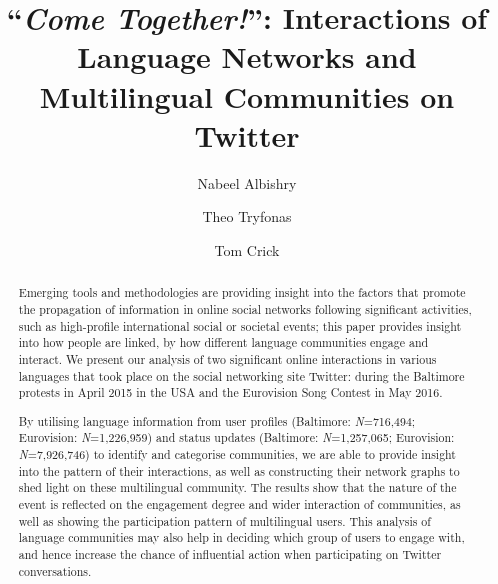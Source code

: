 \documentclass[sigconf]{acmart}
\begin{document}
\title[Interactions of Language Networks and Multilingual Communities on Twitter]{``{\emph{Come Together!}}'': Interactions of Language Networks and Multilingual Communities on Twitter}

\author{Nabeel Albishry}

\author{Theo Tryfonas}

\author{Tom Crick}

\renewcommand{\shortauthors}{N. Albishry et al.}


\begin{abstract}
Emerging tools and methodologies are providing insight into the
factors that promote the propagation of information in online social
networks following significant activities, such as high-profile
international social or societal events; this paper provides insight
into how people are linked, by how different language communities
engage and interact. We present our analysis of two significant online
interactions in various languages that took place on the social
networking site Twitter: during the Baltimore protests in April 2015
in the USA and the Eurovision Song Contest in May 2016.

By utilising language information from user profiles (Baltimore:
{\emph{N}}=716,494; Eurovision: {\emph{N}}=1,226,959) and status
updates (Baltimore: {\emph{N}}=1,257,065; Eurovision:
{\emph{N}}=7,926,746) to identify and categorise communities, we are
able to provide insight into the pattern of their interactions, as
well as constructing their network graphs to shed light on these
multilingual community. The results show that the nature of the event
is reflected on the engagement degree and wider interaction of
communities, as well as showing the participation pattern of
multilingual users. This analysis of language communities may also
help in deciding which group of users to engage with, and hence
increase the chance of influential action when participating on
Twitter conversations.
\end{abstract}
\end{document}
